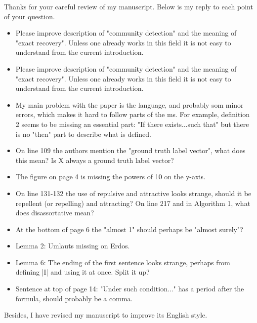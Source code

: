 \documentclass{article}
\begin{document}
	\pagestyle{empty}
	Thanks for your careful review of my manuscript. Below is my reply to each point of your question.
\begin{itemize}
\item Please improve description of "community detection" and the meaning of "exact recovery". Unless one already works in this field it is not easy to understand from the current introduction.

\item Please improve description of "community detection" and the meaning of "exact recovery". Unless one already works in this field it is not easy to understand from the current introduction.

\item My main problem with the paper is the language, and probably som minor errors, which makes it hard to follow parts of the ms. For example, definition 2 seems to be missing an essential part: "If there exists...such that" but there is no "then" part to describe what is defined. 

\item On line 109 the authors mention the "ground truth label vector", what does this mean? Is X always a ground truth label vector? 

\item The figure on page 4 is missing the powers of 10 on the y-axis.

\item On line 131-132 the use of repulsive and attractive looks strange, should it be repellent (or repelling) and attracting? On line 217 and in Algorithm 1, what does disassortative mean?

\item At the bottom of page 6 the "almost 1" should perhaps be "almost surely"?

\item Lemma 2: Umlauts missing on Erdos.

\item Lemma 6: The ending of the first sentence looks strange, perhaps from defining |I| and using it at once. Split it up?

\item Sentence at top of page 14: "Under such condition..." has a period after the formula, should probably be a comma.
\end{itemize}
Besides, I have revised my manuscript to improve its English style.
\end{document}
